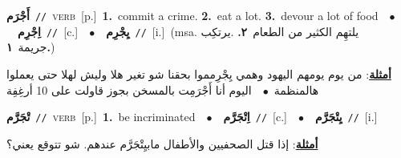 \documentclass[10pt,a4paper,twoside]{article} %
\begin{document}
\begin{multicols}{2}
{\setlength\topsep{0pt}\textbf{\foreignlanguage{arabic}{أَجْرَم}}\ {\color{gray}\texttt{//}\color{black}}\ \textsc{verb}\ [p.]\ \textbf{1.}~commit a crime.  \textbf{2.}~eat a lot.  \textbf{3.}~devour a lot of food\ \ $\bullet$\ \ \setlength\topsep{0pt}\textbf{\foreignlanguage{arabic}{اِجْرِم}}\ {\color{gray}\texttt{//}\color{black}}\ [c.]\ \ $\bullet$\ \ \setlength\topsep{0pt}\textbf{\foreignlanguage{arabic}{يِجْرِم}}\ {\color{gray}\texttt{//}\color{black}}\ [i.]\ \color{gray}(msa. \foreignlanguage{arabic}{يلتهِم الكثير من الطعام}~\foreignlanguage{arabic}{\textbf{٢.}}  .\foreignlanguage{arabic}{يرتكِب جريمة}~\foreignlanguage{arabic}{\textbf{١.}})\color{black}\  \begin{flushright}\color{gray}\foreignlanguage{arabic}{\textbf{\underline{\foreignlanguage{arabic}{أمثلة}}}: من يوم يومهم اليهود وهمي يِجْرِمموا بحقنا شو تغير هلا وليش لهلا حتى يعملوا هالمنظمة\ $\bullet$\ \  اليوم أنا أَجْرَمِت بالمسخن بجوز قاولت على 10 أرغِفِة}\end{flushright}\color{black}} \vspace{2mm}

{\setlength\topsep{0pt}\textbf{\foreignlanguage{arabic}{تْجَرَّم}}\ {\color{gray}\texttt{//}\color{black}}\ \textsc{verb}\ [p.]\ \textbf{1.}~be incriminated\ \ $\bullet$\ \ \setlength\topsep{0pt}\textbf{\foreignlanguage{arabic}{اِتْجَرَّم}}\ {\color{gray}\texttt{//}\color{black}}\ [c.]\ \ $\bullet$\ \ \setlength\topsep{0pt}\textbf{\foreignlanguage{arabic}{يِتْجَرَّم}}\ {\color{gray}\texttt{//}\color{black}}\ [i.]\  \begin{flushright}\color{gray}\foreignlanguage{arabic}{\textbf{\underline{\foreignlanguage{arabic}{أمثلة}}}: إذا قتل الصحفيين والأطفال مابيِتْجَرَّم عندهم. شو تتوقع يعني؟}\end{flushright}\color{black}} \vspace{2mm}


\end{multicols}
\end{document}
